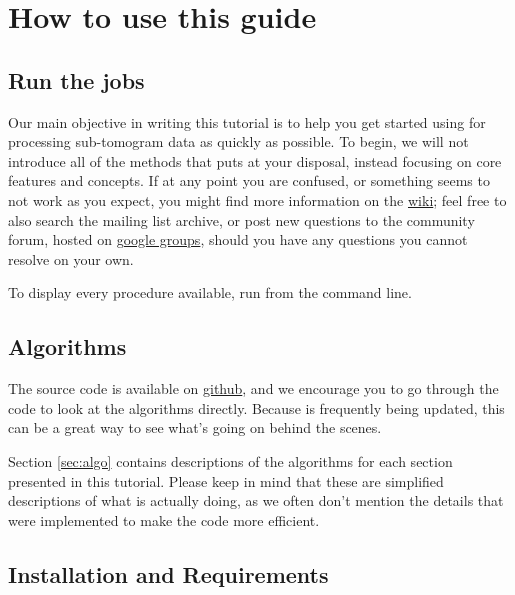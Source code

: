 \section{How to use this guide} \label{sec:tutorial}

\subsection{Run the jobs}

Our main objective in writing this tutorial is to help you get started using {\emClarity} for processing sub-tomogram data as quickly as possible. To begin, we will not introduce all of the methods that {\emClarity} puts at your disposal, instead focusing on core features and concepts. If at any point you are confused, or something seems to not work as you expect, you might find more information on the  \href{https://github.com/bHimes/emClarity/wiki}{wiki}; feel free to also search the mailing list archive, or post new questions to the community forum, hosted on \href{https://groups.google.com/forum/#!forum/emclarity}{google groups}, should you have any questions you cannot resolve on your own.

\begin{tip}To display every procedure available, run  from the command line.
\end{tip}

\subsection{Algorithms}

The {\emClarity} source code is available on \href{https://github.com/bHimes/emClarity/tree/LTS_version_1_5_0}{github}, and we encourage you to go through the code to look at the algorithms directly. Because {\emClarity} is frequently being updated, this can be a great way to see what's going on behind the scenes.

Section \ref{sec:algo} contains descriptions of the algorithms for each section presented in this tutorial. Please keep in mind that these are simplified descriptions of what {\emClarity} is actually doing, as we often don't mention the details that were implemented to make the code more efficient.

\subsection{Installation and Requirements}

